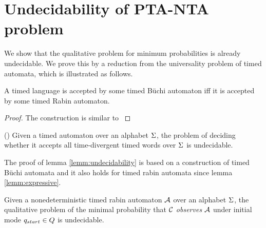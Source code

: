 \section{Undecidability of PTA-NTA problem}
We show that the qualitative problem for minimum probabilities is already undecidable. We prove this by a reduction from the universality problem of timed automata, which is illustrated as follows. 
%
\begin{lemma}\label{lemm:expressive}
A timed language is accepted by some timed B\"uchi automaton iff it is accepted by some timed Rabin automaton.
\end{lemma}
\begin{proof}
    The construction is similar to \cite[Theorem 3.20.]{DBLP:conf/tapsoft/Vaandrager97}
\end{proof}
%
\begin{lemma}{(\cite[Theorem 5.2.]{DBLP:conf/tapsoft/Vaandrager97})}\label{lemm:undecidability}
Given a timed automaton over an alphabet $\Sigma$, the problem of deciding whether it accepts all time-divergent timed words over $\Sigma$ is undecidable.
\end{lemma}
%
The proof of lemma \ref{lemm:undecidability} is based on a construction of timed B\"uchi automata and it also holds for timed rabin
automata since lemma \ref{lemm:expressive}.
%
\begin{proposition}
Given a nonedeterministic timed rabin automaton $\mathcal{A}$ over an alphabet $\Sigma$, the qualitative problem of 
the minimal probability that $\mathcal{C}$ \emph{observes} $\mathcal{A}$ under initial mode 
$q_{start} \in Q$ is undecidable.
\end{proposition}
%
